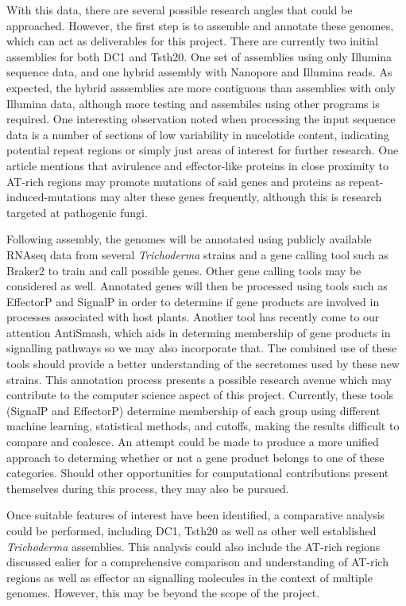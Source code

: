 \documentclass[12pt]{article}
\begin{document}
With this data, there are several possible research angles that could
be approached. However, the first step is to assemble and annotate
these genomes, which can act as deliverables for this project. There
are currently two initial assemblies for both DC1 and Tsth20. One set
of assemblies using only Illumina sequence data, and one hybrid
assembly with Nanopore and Illumina reads. As expected, the
hybrid asssemblies are more contiguous than assemblies with only
Illumina data, although more testing and assembiles using other
programs is required. One interesting observation noted when
processing the input sequence data is a number of sections of low
variability in nucelotide content, indicating potential repeat regions
or simply just areas of interest for further research. One article
mentions that avirulence and effector-like proteins in close proximity
to AT-rich regions may promote mutations of said genes and proteins as
repeat-induced-mutations may alter these genes frequently, although
this is research targeted at pathogenic fungi.

Following assembly, the genomes will be annotated using publicly
available RNAseq data from several \textit{Trichoderma} strains and a
gene calling tool such as Braker2\cite{Braker2} to train and call
possible genes. Other gene calling tools may be considered as
well. Annotated genes will then be processed using tools such as
EffectorP\cite{EffectorP} and SignalP\cite{SignalP} in order to
determine if gene products are involved in processes associated with
host plants. Another tool has recently come to our attention
AntiSmash\cite{AntiSmash}, which aids in determing membership of gene
products in signalling pathways so we may also incorporate that. The
combined use of these tools should provide a better understanding of
the secretomes used by these new strains. This annotation process
presents a possible research avenue which may contribute to the
computer science aspect of this project. Currently, these tools
(SignalP and EffectorP) determine membership of each group using
different machine learning, statistical methods, and cutoffs, making
the results difficult to compare and coalesce. An attempt could be
made to produce a more unified approach to determing whether or not a
gene product belongs to one of these categories. Should other
opportunities for computational contributions present themselves
during this process, they may also be pursued.

Once suitable features of interest have been identified, a comparative
analysis could be performed, including DC1, Tsth20 as well as other
well established \textit{Trichoderma} assemblies. This analysis could
also include the AT-rich regions discussed ealier for a comprehensive
comparison and understanding of AT-rich regions as well as effector an
signalling molecules in the context of multiple genomes. However, this
may be beyond the scope of the project.
\end{document}
